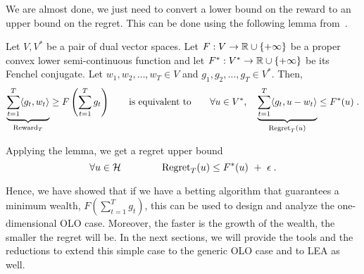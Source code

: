 We are almost done, we just need to convert a lower bound on the reward to an
upper bound on the regret. This can be done using the following lemma
from~\cite{McMahan-Orabona-2014}.
\begin{lemma}
\label{lemma:reward-regret}
Let $V,V^*$ be a pair of dual vector spaces. Let $F:V \to \mathbb{R} \cup \{+\infty\}$
be a proper convex lower semi-continuous function and let $F^*:V^* \to \mathbb{R} \cup
\{+\infty\}$ be its Fenchel conjugate. Let $w_1, w_2, \dots, w_T \in V$ and
$g_1, g_2, \dots, g_T \in V^*$.  Then,
\[
\underbrace{\sum_{t=1}^T \langle g_t, w_t \rangle}_{\operatorname{Reward}_T} \ge F\left( \sum_{t=1}^T g_t \right)
\qquad \text{is equivalent to} \qquad
\forall u \in V^*, \quad
\underbrace{\sum_{t=1}^T \langle g_t, u - w_t\rangle}_{\operatorname{Regret}_T(u)} \le F^*(u) \; .
\]
\end{lemma}

Applying the lemma, we get a regret upper bound
\[
\forall u \in \mathcal{H} \qquad \qquad
\operatorname{Regret}_T(u) \le F^*(u) \ + \ \epsilon \; .
\]

Hence, we have showed that if we have a betting algorithm that guarantees a
minimum wealth, $F(\sum_{t=1}^T g_t)$, this can be used to design and analyze
the one-dimensional \ac{OLO} case. Moreover, the faster is the growth of the wealth, the
smaller the regret will be.  In the next sections, we will provide the tools
and the reductions to extend this simple case to the generic \ac{OLO} case and
to \ac{LEA} as well.
